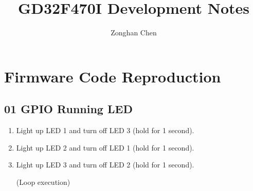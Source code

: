 \documentclass[12pt,a4paper]{ctexart}
\title{GD32F470I Development Notes}
\author{Zonghan Chen}
\date{}
\begin{document}
\maketitle

\newpage
\tableofcontents

\newpage
\listoftables

\newpage
\section{Firmware Code Reproduction}

\subsection{01 GPIO Running LED}

\begin{enumerate}
    \item Light up LED 1 and turn off LED 3 (hold for 1 second).
    \item Light up LED 2 and turn off LED 1 (hold for 1 second).
    \item Light up LED 3 and turn off LED 2 (hold for 1 second).
          
          (Loop execution)
\end{enumerate}
\end{document}
